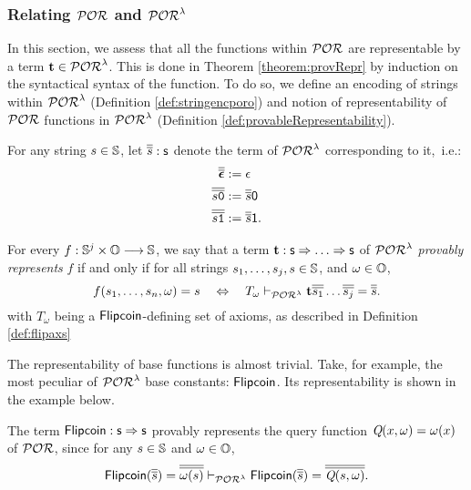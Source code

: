 {%
\subsubsection{Relating $\mathcal{POR}$ and $\mathcal{POR}^\lambda$}
\label{subsub:relating}

In this section, we assess that all the functions
within $\mathcal{POR}$ are representable by a term ${\mathbf t}\in \mathcal{POR}^\lambda$.
This is done in Theorem \ref{theorem:provRepr} by induction
on the syntactical syntax of the function.
%
To do so, we define an encoding of
strings within $\mathcal{POR}^\lambda$ (Definition \ref{def:stringencporo}) and notion of representability
of $\mathcal{POR}$ functions in $\mathcal{POR}^\lambda$
(Definition \ref{def:provableRepresentability}).


\begin{defn}
  \label{def:stringencporo}
  For any string $s\in \mathbb{S}$, let
  $\overline{\overline{s}} : \mathsf{s}$
  denote the term of $\mathcal{POR}^\lambda$
  corresponding to it,~i.e.:
  \begin{align*}
  \overline{\overline{\bm{\epsilon}}}&:=\mathsf{\epsilon}\\
  \overline{\overline{s\mathtt{0}}}&:=\overline{\overline{s}}\mathsf{0}\\
  \overline{\overline{s\mathtt{1}}}&:=\overline{\overline{s}}\mathsf{1}.
  \end{align*}
\end{defn}


\begin{defn}\label{def:provableRepresentability}
For every $f:\mathbb{S}^j \times \mathbb{O} \longrightarrow \mathbb{S}$,
we say that a term $\tTerm :\sT \arrowT \dots \arrowT \sT$
of $\mathcal{POR}^\lambda$
\emph{provably represents} $f$
if and only if for all strings $s_1,\dots, s_j,s
\in \mathbb{S}$,
and $\omega \in \mathbb{O}$,
$$
f(s_1,\dots, s_n,\omega) = s \ \ \ \Leftrightarrow \ \ \
T_\omega \vdash_{\PORo} \tTerm \ooverline{s_1} \dots
\ooverline{s_j} = \ooverline{s}.
$$
with $T_\omega$ being a $\mathsf{Flipcoin}$-defining set of axioms, as described in Definition \ref{def:flipaxs}
\end{defn}
%
%
\noindent
The representability of base functions is almost trivial.
Take, for example, the most peculiar of $\mathcal{POR}^\lambda$ base constants:
$\mathsf{Flipcoin}$. Its representability is shown in the example below.


\begin{ex}\label{ex:flipcoin}
The term $\mathsf{Flipcoin}:\mathsf{s} \Rightarrow \mathsf{s}$
provably represents
the query function $\emph{Q}(x,\omega)=\omega(x)$
of $\mathcal{POR}$,
since for any $s\in \mathbb{S}$ and $\omega\in \mathbb{O}$,
$$
\mathsf{Flipcoin}(\overline{\overline{s}})=\overline{\overline{\omega(s)}}\vdash_{\mathcal{POR}^\lambda}
\mathsf{Flipcoin}(\overline{\overline{s}}) =\overline{\overline{\emph{Q}(s,\omega)}}.
$$
\end{ex}

}
